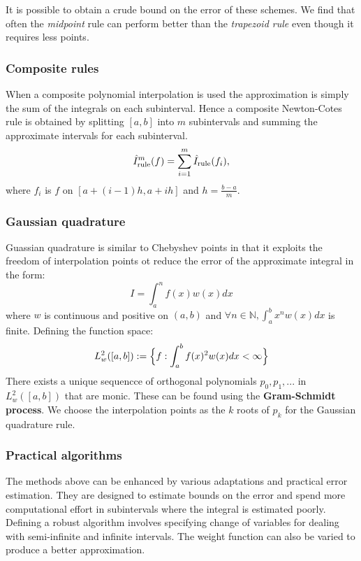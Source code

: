\documentclass[
]{article}
\begin{document}
It is possible to obtain a crude bound on the error of these schemes. We
find that often the \emph{midpoint} rule can perform better than the
\emph{trapezoid rule} even though it requires less points.

\hypertarget{composite-rules}{%
\subsubsection{Composite rules}\label{composite-rules}}

When a composite polynomial interpolation is used the approximation is
simply the sum of the integrals on each subinterval. Hence a composite
Newton-Cotes rule is obtained by splitting \([a,b]\) into \(m\)
subintervals and summing the approximate intervals for each subinterval.
\[\hat{I}^m_{\rm rule}(f) = \sum_{i=1}^m \hat{I}_{\rm rule}(f_i), \]
where \(f_{i}\) is \(f\) on \([a + (i-1)h,a+ih]\) and
\(h = \frac{b-a}{m}\).

\hypertarget{gaussian-quadrature}{%
\subsubsection{Gaussian quadrature}\label{gaussian-quadrature}}

Guassian quadrature is similar to Chebyshev points in that it exploits
the freedom of interpolation points ot reduce the error of the
approximate integral in the form: \[ I = \int_{a}^{n}f(x)w(x)dx \] where
\(w\) is continuous and positive on \((a,b)\) and
\(\forall n \in \mathbb{N},\int_{a}^{b}x^{n}w(x)dx\) is finite. Defining
the function space:
\[L_{w}^{2}([a,b]) := \Big{ \{ } f:\int_{a}^{b} f(x)^{2}w(x)dx < \infty \Big{ \} } \]
There exists a unique sequencce of orthogonal polynomials
\(p_{0},p_{1},...\) in \(L_{w}^{2}([a,b])\) that are monic. These can be
found using the \textbf{Gram-Schmidt process}. We choose the
interpolation points as the \(k\) roots of \(p_{k}\) for the Gaussian
quadrature rule.

\hypertarget{practical-algorithms}{%
\subsubsection{Practical algorithms}\label{practical-algorithms}}

The methods above can be enhanced by various adaptations and practical
error estimation. They are designed to estimate bounds on the error and
spend more computational effort in subintervals where the integral is
estimated poorly. Defining a robust algorithm involves specifying change
of variables for dealing with semi-infinite and infinite intervals. The
weight function can also be varied to produce a better approximation.
\end{document}

